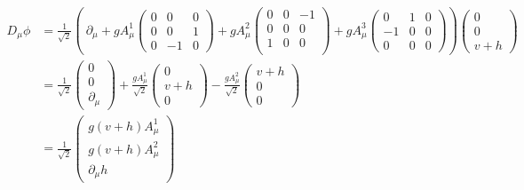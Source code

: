 \begin{equation}\label{eq:non_abelian_higgs_mechanism_covariant_derivative_on_phi}
\begin{aligned}
D_{\mu}\phi & = \frac{1}{\sqrt{2}}\left(~\partial_{\mu} + gA_{\mu}^{1}
  \begin{pmatrix}
    0  &  0  &  0 \\
    0  &  0  &  1 \\
    0  & -1 &  0 
  \end{pmatrix}
  + gA_{\mu}^{2}
  \begin{pmatrix}
    0  &  0  & -1 \\
    0  &  0  &  0 \\
    1  &  0  &  0 \\ 
  \end{pmatrix}
+ gA_{\mu}^{3}
  \begin{pmatrix}
    0  &   1  &  0 \\
   -1 &   0  &  0 \\
    0  &   0  &  0
  \end{pmatrix}
\right)
  \begin{pmatrix}
    0 \\
    0 \\
    v + h
  \end{pmatrix} \\
 & = \frac{1}{\sqrt{2}}
  \begin{pmatrix}
    0 \\
    0 \\
    \partial_{\mu}
  \end{pmatrix}
  + \frac{gA_{\mu}^{1}}{\sqrt{2}}
  \begin{pmatrix}
    0 \\
    v+h \\
    0
  \end{pmatrix}
  - \frac{gA_{\mu}^{2}}{\sqrt{2}}
  \begin{pmatrix}
    v+h \\
    0 \\
    0
    \end{pmatrix} \\
 & = \frac{1}{\sqrt{2}}
  \begin{pmatrix}
    g(v+h)A_{\mu}^{1} \\
    g(v+h)A_{\mu}^{2} \\
    \partial_{\mu}h
  \end{pmatrix}
\end{aligned}
\end{equation}

